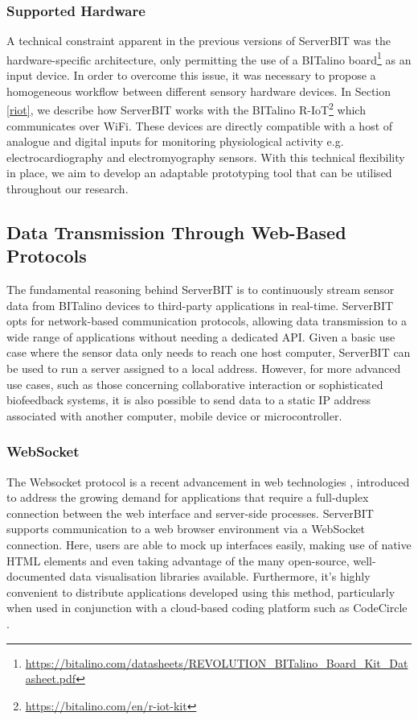 \subsubsection*{Supported Hardware} \label{hardware}

A technical constraint apparent in the previous versions of ServerBIT was the hardware-specific architecture, only permitting the use of a BITalino board\footnote{\url{https://bitalino.com/datasheets/REVOLUTION_BITalino_Board_Kit_Datasheet.pdf}} as an input device. In order to overcome this issue, it was necessary to propose a homogeneous workflow between different sensory hardware devices. In Section \ref{riot}, we describe how ServerBIT works with the BITalino R-IoT\footnote{\url{https://bitalino.com/en/r-iot-kit}} which communicates over WiFi. These devices are directly compatible with a host of analogue and digital inputs for monitoring physiological activity e.g. electrocardiography and electromyography sensors. With this technical flexibility in place, we aim to develop an adaptable prototyping tool that can be utilised throughout our research.

\subsection{Data Transmission Through Web-Based Protocols}
The fundamental reasoning behind ServerBIT is to continuously stream sensor data from BITalino devices to third-party applications in real-time. ServerBIT opts for network-based communication protocols, allowing data transmission to a wide range of applications without needing a dedicated API. Given a basic use case where the sensor data only needs to reach one host computer, ServerBIT can be used to run a server assigned to a local address. However, for more advanced use cases, such as those concerning collaborative interaction or sophisticated biofeedback systems, it is also possible to send data to a static IP address associated with another computer, mobile device or microcontroller.

\subsubsection*{WebSocket}

The Websocket protocol is a recent advancement in web technologies \cite{lombardi_websocket:_2015}, introduced to address the growing demand for applications that require a full-duplex connection between the web interface and server-side processes. ServerBIT supports communication to a web browser environment via a WebSocket connection. Here, users are able to mock up interfaces easily, making use of native HTML elements and even taking advantage of the many open-source, well-documented data visualisation libraries available. Furthermore, it’s highly convenient to distribute applications developed using this method, particularly when used in conjunction with a cloud-based coding platform such as CodeCircle \cite{fiala_collaborative_2016}.

